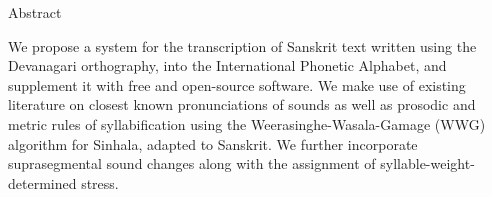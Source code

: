 \documentclass[final]{beamer}
\newlength{\sepwid}
\newlength{\twocolwid}
\begin{document}
\begin{frame}[t] %


        \begin{columns}[t]  %


            \begin{column}{\sepwid}\end{column} %

            \begin{column}{\twocolwid} %



                \begin{alertblock}{Abstract}
                
                    We propose a system for the transcription of Sanskrit text written using the Devanagari orthography,
                    into the International Phonetic Alphabet, and supplement it with free and open-source software.
                    We make use of existing literature on closest known pronunciations of sounds as well as prosodic
                    and metric rules of syllabification using the Weerasinghe-Wasala-Gamage (WWG) algorithm for Sinhala,
                    adapted to Sanskrit. We further incorporate suprasegmental sound changes along with the assignment of
                    syllable-weight-determined stress.

                \end{alertblock}


	


\end{column}
\end{columns}
\end{frame}
\end{document}
